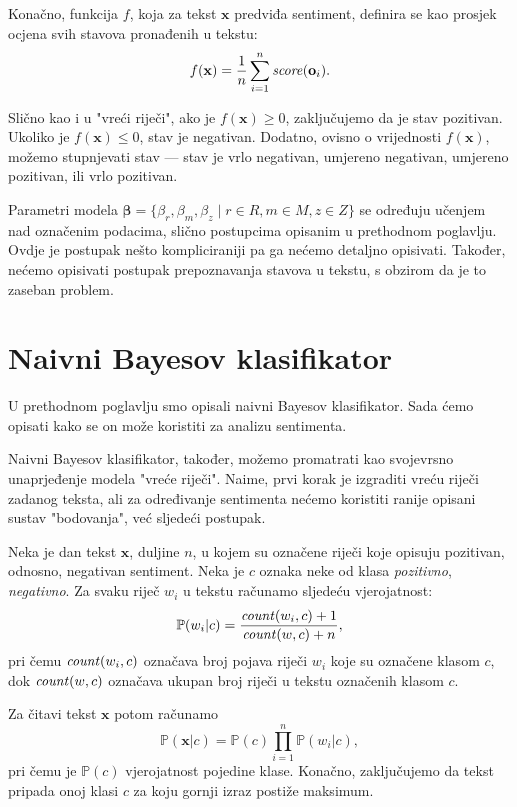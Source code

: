 \documentclass[a4paper,twoside,12pt]{memoir} %
\newcommand{\ti}[1]{\textit{#1\/}}
\begin{document}
	Konačno, funkcija $f$, koja za tekst $\mathbf{x}$ predviđa sentiment, definira se kao prosjek ocjena svih stavova pronađenih u tekstu:
	\begin{equation}
	f(\mathbf{x}) = \frac{1}{n} \sum_{i=1}^{n} \ti{score} (\mathbf{o}_i).
	\end{equation}

	Slično kao i u "vreći riječi", ako je $f(\mathbf{x}) \ge 0$, zaključujemo da je stav pozitivan. Ukoliko je $f(\mathbf{x}) \le 0$, stav je negativan. Dodatno, ovisno o vrijednosti $f(\mathbf{x})$, možemo stupnjevati stav --- stav je vrlo negativan, umjereno negativan, umjereno pozitivan, ili vrlo pozitivan.

	Parametri modela $\bm{\beta} = \{\beta_r, \beta_m, \beta_z \mid r \in R, m \in M, z \in Z \}$ se određuju učenjem nad označenim podacima, slično postupcima opisanim u prethodnom poglavlju. Ovdje je postupak nešto kompliciraniji pa ga nećemo detaljno opisivati. Također, nećemo opisivati postupak prepoznavanja stavova u tekstu, s obzirom da je to zaseban problem.

	\section{Naivni Bayesov klasifikator}

	U prethodnom poglavlju smo opisali naivni Bayesov klasifikator. Sada ćemo opisati kako se on može koristiti za analizu sentimenta.

	Naivni Bayesov klasifikator, također, možemo promatrati kao svojevrsno una\-prje\-đe\-nje modela "vreće riječi". Naime, prvi korak je izgraditi vreću riječi zadanog teksta, ali za određivanje sentimenta nećemo koristiti ranije opisani sustav "bodovanja", već sljedeći postupak.

	Neka je dan tekst $\mathbf{x}$, duljine $n$, u kojem su označene riječi koje opisuju pozitivan, odnosno, negativan sentiment. Neka je $c$ oznaka neke od klasa \ti{pozitivno}, \ti{negativno}. Za svaku riječ $w_i$ u tekstu računamo sljedeću vjerojatnost:
	\begin{equation*}
	\mathbb{P}(w_i | c) = \frac{\ti{count}(w_i, c) + 1}{\ti{count}(w, c) + n},
	\end{equation*}
	pri čemu $\ti{count}(w_i, c)$ označava broj pojava riječi $w_i$ koje su označene klasom $c$, dok $\ti{count}(w, c)$ označava ukupan broj riječi u tekstu označenih klasom $c$.

	Za čitavi tekst $\mathbf{x}$ potom računamo
	\begin{equation*}
	\mathbb{P}(\mathbf{x} | c) = \mathbb{P}(c) \prod_{i=1}^{n} \mathbb{P}(w_i | c),
	\end{equation*}
	pri čemu je $ \mathbb{P}(c)$ vjerojatnost pojedine klase.
	Konačno, zaključujemo da tekst pripada onoj klasi $c$ za koju gornji izraz postiže maksimum.
\end{document}
